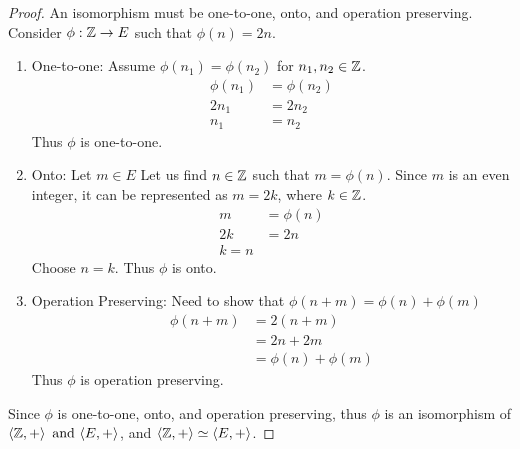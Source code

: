 \documentclass{article}
\begin{document}
\begin{proof}
    An isomorphism must be one-to-one, onto, and operation preserving. Consider $\phi:  \mathbb{Z} \rightarrow E$ such that $\phi(n) = 2n$.
    \begin{enumerate}
        \item One-to-one: Assume $\phi(n_1) = \phi(n_2)$ for $n_1,n_2 \in \mathbb{Z}$.
              \begin{align*}
                  \phi(n_1) & = \phi(n_2) \\
                  2n_1      & = 2n_2      \\
                  n_1       & = n_2
              \end{align*}
              Thus $\phi$ is one-to-one.
        \item Onto: Let $m \in E$ Let us find $n \in \mathbb{Z}$ such that $m = \phi(n)$. Since $m$ is an even integer, it can be represented as $m = 2k$, where $k \in \mathbb{Z}$.
              \begin{align*}
                  m  & = \phi(n) \\
                  2k & = 2n      \\
                  k = n
              \end{align*}
              Choose $n = k$. Thus $\phi$ is onto.
        \item Operation Preserving: Need to show that $\phi(n + m) = \phi(n) + \phi(m)$
              \begin{align*}
                  \phi(n + m) & = 2(n+m)            \\
                              & = 2n + 2m           \\
                              & = \phi(n) + \phi(m)
              \end{align*}
              Thus $\phi$ is operation preserving.
    \end{enumerate}
    Since $\phi$ is one-to-one, onto, and operation preserving, thus $\phi$ is an isomorphism of $\langle \mathbb{Z},+ \rangle \operatorname{~\text{and}~} \langle E,+ \rangle$, and $\langle \mathbb{Z},+ \rangle \simeq \langle E,+ \rangle$.
\end{proof}
\qdash
\end{document}

